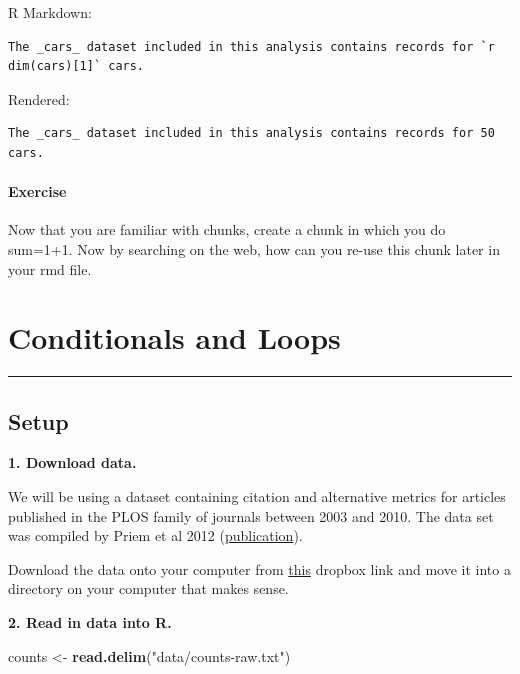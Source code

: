 \documentclass[
]{book}
\newenvironment{Shaded}{\begin{snugshade}}{\end{snugshade}}
\newcommand{\KeywordTok}[1]{\textcolor[rgb]{0.13,0.29,0.53}{\textbf{#1}}}
\newcommand{\NormalTok}[1]{#1}
\newcommand{\StringTok}[1]{\textcolor[rgb]{0.31,0.60,0.02}{#1}}
\begin{document}
R Markdown:

\begin{verbatim}
The _cars_ dataset included in this analysis contains records for `r dim(cars)[1]` cars. 
\end{verbatim}

Rendered:

\begin{verbatim}
The _cars_ dataset included in this analysis contains records for 50 cars.
\end{verbatim}

\hypertarget{exercise-1}{%
\subsubsection*{Exercise}\label{exercise-1}}

Now that you are familiar with chunks, create a chunk in which you do sum=1+1. Now by searching on the web, how can you re-use this chunk later in your rmd file.

\hypertarget{conditionals-and-loops}{%
\chapter{Conditionals and Loops}\label{conditionals-and-loops}}

\begin{center}\rule{0.5\linewidth}{0.5pt}\end{center}

\hypertarget{setup}{%
\section{Setup}\label{setup}}

\textbf{1. Download data.}

We will be using a dataset containing citation and alternative metrics for articles published in the PLOS family of journals between 2003 and 2010. The data set was compiled by Priem et al 2012 (\href{http://arxiv.org/abs/1203.4745}{publication}).

Download the data onto your computer from \href{https://www.dropbox.com/s/up38z3fd4llanrb/counts-raw.txt?dl=0}{this} dropbox link and move it into a directory on your computer that makes sense.

\textbf{2. Read in data into R.}

\begin{Shaded}
\begin{Highlighting}[]
\NormalTok{counts <-}\StringTok{ }\KeywordTok{read.delim}\NormalTok{(}\StringTok{"data/counts-raw.txt"}\NormalTok{)}
\end{Highlighting}
\end{Shaded}
\end{document}
